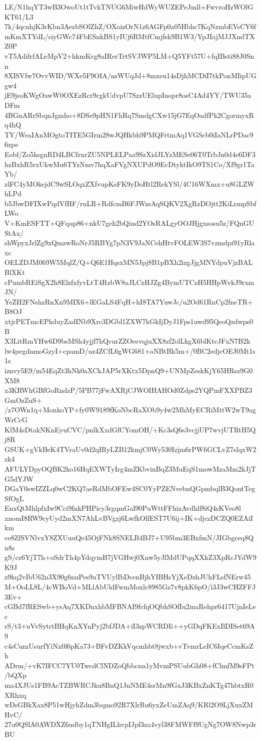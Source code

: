 LE/N1hqYT3wB3OwoUt1tTvkTNUG6MiwHdWyWUZEPeJmll+FwvroHzWOlGKT61/L3
7k/4qcnhjK3rKbn3AezbSOlZhZ/OXoizOrN1z6AGFp0a05Hbhc7KqNzmbEVsCY6f
mKmXTYdL/siyGWc74FbESnkBS1yIUj6RMtfCmjfsk9B1W3/YpJIajMJJXndTXZ0P
vT5AdifrfALeMpV2+hkmKvg8aIRerTrtSVJWP5LM+Q5YFt57U+fqIBsti88J0Snn
8XISVfw7OvvWID/WXe5F9OIA/nsWUqJd+8mxeu14sDjhMCDiI7tkPonMIipUGgw4
jE9jsoKWgOawW0OXEzRcr9cgkUdvpU7SzzUElupInopr8osC4Ad4YY/TWU35aDFm
4BGnARrSbqnJgmho+8DSe9pHN1FhRq7SmdgCXw15jG7EqOadfPk2CgormyxRq4hQ
TY/WeaIAnMOgtoTITE5GIrm28wJQHkbh9PMQFrtmAq1VGScb0iIaNLrPDac96zpe
Eobf/Zo5ksgnRD4LBCfrnrZU5NPLELPaa9SzXidJLYzMESe06T0TrbJn0d4e6DF3
hzBxhR5rxUkwMu6TYzNmv7hqXaFVgNXUPdO9EcDtyktIkO9TS1Co/Xf9gr1TaYb/
zlFC4yMOkejdC9wSLOqxZXfvupKsFK9yDoHtl2RekYSl/4C16WXmx+u8GLZWhLPd
b5JbwDFIXwPqdVfHF/ruLR+RdfcmB6FJWzsAqSQKV2XgRzDOjtt2KiLrmpSbfLWo
V+KmESFTT+QFqup86+nkU7geh2bQind2YOsRALgyOOJHjgxsosu5z/FQnGUStAx/
shWpyxJrlZg9xQmzwRoNrJ5RBYg7pN3V9JaNCehHtvFOLEW3S7vzmdpi91yRlaxc
OELZDJM069W5MqlZ/Q+Q6E1HqsxMN5Jpj8B1pBXh2izgJjgMNYdpuVjzBALBlXKt
cPumbREiSgX2h8ElzfxfyvLtT4RzbW8aJLCzHJZg4BymUTCzH5HHpWvkJ9rxmJN/
YeZH2FNshzRnXn9MIX6+lEGaLS4FqH+hI8TA7YuwJc/u2Od61RnCp2fneTR+B8OJ
xtjrPETmcEPkduyZadINb9Xrc3DGbl1ZXW7kGkIjDyJ1Fps1uwd95QeoQzdwps0B
X3LitRmYHw6D9bsMSh4yjjf7hQcurZZOeevqjuXX8zf2olLkgX6blKtcJFxN7B2k
lw4pegdnmoGzyI+cpamD/uz4ZCfL6gWG681+oNBtBk5m+/0BC2edjcOEJ0Mt1s1s
iznvy5E9/m54EqZt3hNk0aXCkJAP5rXKtx5DpnQ9+UNMpZeskKjY65HRsz9G0XM8
x3KRWhGBfGoRndzP/5PB77jFwAXRjCJWOIHAHOd0Zdps2YQPmFXXPBZ3GmOzZuS+
/z7OWn1q+MonkoYP+fy0W9189fKoNbcRaXOb9y4w2MhMyECRiMttW2wT9agWrCcG
KfM4sDtakNKnEyuCVC/pnlkXxdGfCYomOH/+Kc3sQ6s3vcjjUP7wvjUTRtH5Qj8R
GSUK+gVkBeK4TVraUv0d2qIRyLZB12kmjC0Wy530Izjm6rPW6GCLvZ7slqxW2zk4
AFULYDpyOQBK2ko16HqEXWTyIrg4mZKbvinBqZ3MuEqS1mowMzaMm2kJjTG5dYJW
DGaY0swIZZLq0wC2KQ7aeRdMbOFEw4SC0YyPZENvebnQGpmbqlB3QontTegSfOgL
EnxQtMhlpfxIw9Cci9fnkPHPicy3rgqmGal90PuWttFFhizAvdhlf8iQ4sKVeo8l
xnomI8RW9cyUyd2mXN7AhLvBVgzj6LwfkOlfEST7U6ij+IK+djczDCZQ0EZAiIkm
ce8ZfSVNlvxY8ZXUuuQe45OjFNk8SNELB4BJ7+U95bm3EBxfmN/JIGbgceq8Qn8s
gS/cz6YjT7h+oSdrTh4pYdqymB7jVGHwj0Xnw5yJlMdUPqqXXkZ3XpRcJYdW9K9J
z9kq2vIbU62n3X90g6nuPes9uTVUylIbDcenBjhYIBHsYjXeDzhJUhFLsfNErw45
M+OoLL8L/4cWBoVd+MLlAbUldFwmMoxlc8985Gz7v8pkK6pO/i3J3wCHZFFJ3Ev+
cGBd7fRESwb+ysAq7XKDnxhbMFBNAI9fcfqOQbhSOfIu2maRehpr6417UjnIeLec
rS/t3+uVvSytrtBHqKnXYnPyj2bfJDA+iI3zpWCRDIi++yGDqFKExIlDISet69A9
c4sCumUsurfYiNx0l6pKa73+BFvDZKkVqcmhbt8jwxb+vTvmrLeIC6IqeCcmKsZh
ADrm/+vK7IFCC7YU0TwcdClNDZoQbbcnn1yMvmPSUubGh08+fClmfM9sFPt/bQXp
ma4XJUs1FB9AcTZBWRCJku8BnQ1JnNME4srMn9fGxJ3KBxZnKTg47hbtxR0XRhxq
wDsGBkXax8P51wHjyhZdm3bqmo92R7XlrRu6yxZeUmZAq9/KRl2O9LjXuxZMHvC/
27u0QSlA0AWDXZ6udby1qTNHgILhvpIJpf3za4vyl38FMWFf9UgNg7OW8Nwp3rBU
